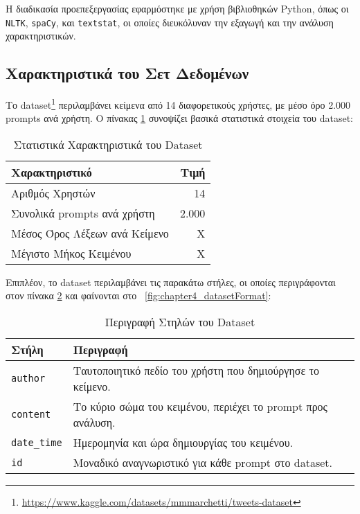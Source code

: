 Η διαδικασία προεπεξεργασίας εφαρμόστηκε με χρήση βιβλιοθηκών Python, όπως οι \texttt{NLTK}, \texttt{spaCy}, και \texttt{textstat}, οι οποίες διευκόλυναν την εξαγωγή και την ανάλυση χαρακτηριστικών.

\subsection{Χαρακτηριστικά του Σετ Δεδομένων}

Το dataset\footnote{\url{https://www.kaggle.com/datasets/mmmarchetti/tweets-dataset}}
 περιλαμβάνει κείμενα από 14 διαφορετικούς χρήστες, με μέσο όρο 2.000 prompts ανά χρήστη. Ο πίνακας \ref{table:dataset_stats} συνοψίζει βασικά στατιστικά στοιχεία του dataset:

\begin{table}[h!]
\centering
\begin{tabular}{|l|r|}
\hline
\textbf{Χαρακτηριστικό} & \textbf{Τιμή} \\ \hline
Αριθμός Χρηστών & 14 \\ \hline
Συνολικά prompts ανά χρήστη & 2.000 \\ \hline
Μέσος Όρος Λέξεων ανά Κείμενο & Χ \\ \hline
Μέγιστο Μήκος Κειμένου & Χ \\ \hline
\end{tabular}
\caption{Στατιστικά Χαρακτηριστικά του Dataset}
\label{table:dataset_stats}
\end{table}

Επιπλέον, το dataset περιλαμβάνει τις παρακάτω στήλες, οι οποίες περιγράφονται στον πίνακα \ref{table:dataset_columns} και φαίνονται στο ~\autoref{fig:chapter4_datasetFormat}:

\begin{table}[h!]
\centering
\begin{tabular}{|l|l|}
\hline
\textbf{Στήλη} & \textbf{Περιγραφή} \\ \hline
\texttt{author} & Ταυτοποιητικό πεδίο του χρήστη που δημιούργησε το κείμενο. \\ \hline
\texttt{content} & Το κύριο σώμα του κειμένου, περιέχει το prompt προς ανάλυση. \\ \hline
\texttt{date\_time} & Ημερομηνία και ώρα δημιουργίας του κειμένου. \\ \hline
\texttt{id} & Μοναδικό αναγνωριστικό για κάθε prompt στο dataset. \\ \hline
\end{tabular}
\caption{Περιγραφή Στηλών του Dataset}
\label{table:dataset_columns}
\end{table}

